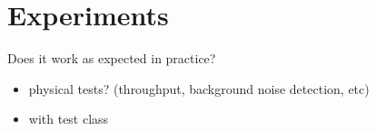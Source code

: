 \chapter{Experiments}
Does it work as expected in practice?
\begin{itemize}
\item physical tests? (throughput, background noise detection, etc)
\item with test class
\end{itemize}
